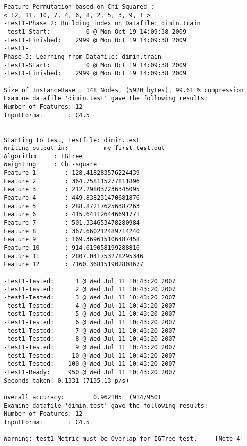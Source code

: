 \documentclass{report}
\begin{document}
\begin{footnotesize}
\begin{verbatim}
Feature Permutation based on Chi-Squared :
< 12, 11, 10, 7, 4, 6, 8, 2, 5, 3, 9, 1 >
-test1-Phase 2: Building index on Datafile: dimin.train
-test1-Start:          0 @ Mon Oct 19 14:09:38 2009
-test1-Finished:    2999 @ Mon Oct 19 14:09:38 2009
-test1-
Phase 3: Learning from Datafile: dimin.train
-test1-Start:          0 @ Mon Oct 19 14:09:38 2009
-test1-Finished:    2999 @ Mon Oct 19 14:09:38 2009

Size of InstanceBase = 148 Nodes, (5920 bytes), 99.61 % compression
Examine datafile 'dimin.test' gave the following results:
Number of Features: 12
InputFormat       : C4.5


Starting to test, Testfile: dimin.test
Writing output in:          my_first_test.out
Algorithm     : IGTree
Weighting     : Chi-square
Feature 1        : 128.418283576224439
Feature 2        : 364.758115277811896
Feature 3        : 212.298037236345095
Feature 4        : 449.838231470681876
Feature 5        : 288.872176256387263
Feature 6        : 415.641126446691771
Feature 7        : 501.334653478280984
Feature 8        : 367.660212489714240
Feature 9        : 169.369615106487458
Feature 10       : 914.619058199288816
Feature 11       : 2807.041753278295346
Feature 12       : 7160.368151902808677

-test1-Tested:      1 @ Wed Jul 11 10:43:20 2007
-test1-Tested:      2 @ Wed Jul 11 10:43:20 2007
-test1-Tested:      3 @ Wed Jul 11 10:43:20 2007
-test1-Tested:      4 @ Wed Jul 11 10:43:20 2007
-test1-Tested:      5 @ Wed Jul 11 10:43:20 2007
-test1-Tested:      6 @ Wed Jul 11 10:43:20 2007
-test1-Tested:      7 @ Wed Jul 11 10:43:20 2007
-test1-Tested:      8 @ Wed Jul 11 10:43:20 2007
-test1-Tested:      9 @ Wed Jul 11 10:43:20 2007
-test1-Tested:     10 @ Wed Jul 11 10:43:20 2007
-test1-Tested:    100 @ Wed Jul 11 10:43:20 2007
-test1-Ready:     950 @ Wed Jul 11 10:43:20 2007
Seconds taken: 0.1331 (7135.13 p/s)

overall accuracy:        0.962105  (914/950)
Examine datafile 'dimin.test' gave the following results:
Number of Features: 12
InputFormat       : C4.5

Warning:-test1-Metric must be Overlap for IGTree test.     [Note 4]

\end{verbatim}
\end{footnotesize}
\end{document}
